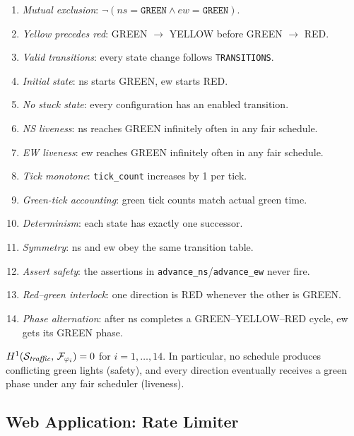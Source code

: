 \begin{enumerate}[nosep,label=(\roman*)]
  \item \emph{Mutual exclusion}: $\lnot(\mathit{ns} = \texttt{GREEN}
    \land \mathit{ew} = \texttt{GREEN})$.
  \item \emph{Yellow precedes red}: GREEN $\to$ YELLOW before
    GREEN $\to$ RED.
  \item \emph{Valid transitions}: every state change follows
    \texttt{TRANSITIONS}.
  \item \emph{Initial state}: ns starts GREEN, ew starts RED.
  \item \emph{No stuck state}: every configuration has an enabled
    transition.
  \item \emph{NS liveness}: ns reaches GREEN infinitely often
    in any fair schedule.
  \item \emph{EW liveness}: ew reaches GREEN infinitely often
    in any fair schedule.
  \item \emph{Tick monotone}: \texttt{tick\_count} increases by 1 per tick.
  \item \emph{Green-tick accounting}: green tick counts match actual
    green time.
  \item \emph{Determinism}: each state has exactly one successor.
  \item \emph{Symmetry}: ns and ew obey the same transition table.
  \item \emph{Assert safety}: the assertions in \texttt{advance\_ns}/\texttt{advance\_ew}
    never fire.
  \item \emph{Red--green interlock}: one direction is RED whenever the
    other is GREEN.
  \item \emph{Phase alternation}: after ns completes a GREEN--YELLOW--RED
    cycle, ew gets its GREEN phase.
\end{enumerate}

\begin{theorem}\label{thm:traffic}
$H^{1}(\mathcal{S}_{\mathit{traffic}},\,\mathcal{F}_{\varphi_i}) = 0$
for $i = 1,\ldots,14$.  In particular, no schedule produces
conflicting green lights (safety), and every direction eventually
receives a green phase under any fair scheduler (liveness).
\end{theorem}


\subsection{Web Application: Rate Limiter}\label{sec:app-rate}

